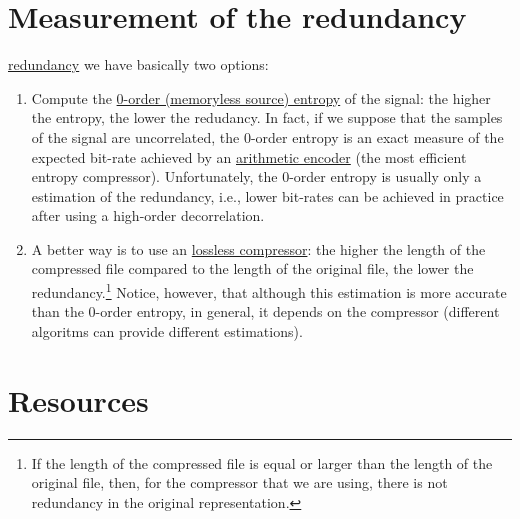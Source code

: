 \section{Measurement of the redundancy}
\href{https://en.wikipedia.org/wiki/Redundancy_(information_theory)}{redundancy}
we have basically two options:
\begin{enumerate}
\item Compute the
  \href{https://en.wikipedia.org/wiki/Entropy_(information_theory)}{0-order
    (memoryless source) entropy} of the signal: the higher the
  entropy, the lower the redudancy. In fact, if we suppose that the
  samples of the signal are uncorrelated, the 0-order entropy is an
  exact measure of the expected bit-rate achieved by an
  \href{https://en.wikipedia.org/wiki/Arithmetic_coding}{arithmetic
    encoder} (the most efficient entropy compressor). Unfortunately,
  the 0-order entropy is usually only a estimation of the redundancy,
  i.e., lower bit-rates can be achieved in practice after using a high-order
  decorrelation.
\item A better way is to use an
  \href{https://en.wikipedia.org/wiki/Data_compression}{lossless
    compressor}: the higher the length of the compressed file compared
  to the length of the original file, the lower the
  redundancy.\footnote{If the length of the compressed file is equal or
  larger than the length of the original file, then, for the compressor
  that we are using, there is not redundancy in the original
  representation.} Notice, however, that although this estimation is
  more accurate than the 0-order entropy, in general, it depends on the
  compressor (different algoritms can provide different
  estimations).
\end{enumerate}


\section{Resources}
\renewcommand{\addcontentsline}[3]{}%

